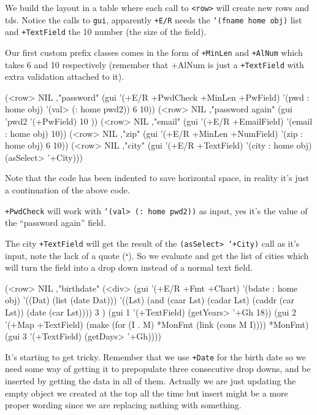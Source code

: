 We build the layout in a table where each call to
\texttt{\textless{}row\textgreater{}} will create new rows and tds.
Notice the calls to \texttt{gui}, apparently \texttt{+E/R} needs the
\texttt{‘(fname home obj)} list and \texttt{+TextField} the 10 number
(the size of the field).

Our first custom prefix classes comes in the form of \texttt{+MinLen}
and \texttt{+AlNum} which takes 6 and 10 respectively (remember that
+AlNum is just a \texttt{+TextField} with extra validation attached to
it).

\begin{wideverbatim}
(<row> NIL ,"password"       
   (gui 
      '(+E/R +PwdCheck +MinLen +PwField) 
      '(pwd : home obj) 
      '(val> (: home pwd2)) 6 10))
(<row> NIL ,"password again" (gui 'pwd2 '(+PwField) 10 ))
(<row> NIL ,"email" (gui '(+E/R +EmailField)       '(email : home obj) 10))
(<row> NIL ,"zip"   (gui '(+E/R +MinLen +NumField) '(zip : home obj) 6 10))
(<row> NIL ,"city"  (gui '(+E/R +TextField)        '(city : home obj) (asSelect> '+City)))
\end{wideverbatim}

Note that the code has been indented to save horizontal space, in
reality it's just a continuation of the above code.

\texttt{+PwdCheck} will work with \texttt{‘(val> (: home pwd2))} as
input, yes it's the value of the ``password again'' field.

The city \texttt{+TextField} will get the result of the \texttt{(asSelect>
‘+City)} call as it's input, note the lack of a quote (\textbf{‘}). So
we evaluate and get the list of cities which will turn the field into
a drop down instead of a normal text field.

\begin{wideverbatim}
(<row> NIL ,"birthdate" 
   (<div> 
      (gui '(+E/R +Fmt +Chart) '(bdate : home obj)
         '((Dat) (list (date Dat)))
         '((Lst) (and (caar Lst) (cadar Lst) (caddr (car Lst)) (date (car Lst))))
         3 )
      (gui 1 '(+TextField) (getYears> '+Gh 18))
      (gui 2 '(+Map +TextField)
         (make 
            (for (I . M) *MonFmt 
               (link (cons M I))))
         *MonFmt)
      (gui 3 '(+TextField) (getDays> '+Gh))))
\end{wideverbatim}

It's starting to get tricky. Remember that we use \texttt{+Date} for
the birth date so we need some way of getting it to prepopulate three
consecutive drop downs, and be inserted by getting the data in all of
them. Actually we are just updating the empty object we created at the
top all the time but insert might be a more proper wording since we
are replacing nothing with something.

